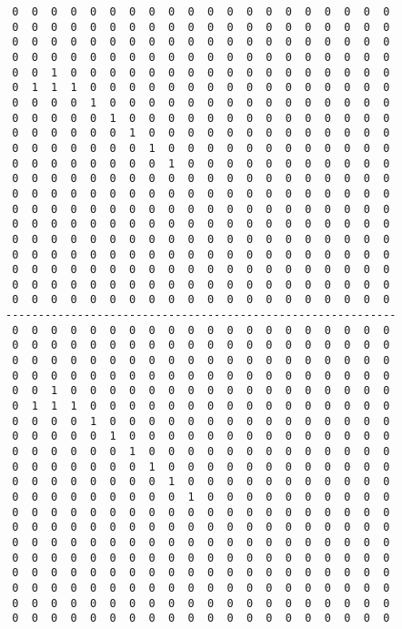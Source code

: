 \begin{verbatim}
 0  0  0  0  0  0  0  0  0  0  0  0  0  0  0  0  0  0  0  0
 0  0  0  0  0  0  0  0  0  0  0  0  0  0  0  0  0  0  0  0
 0  0  0  0  0  0  0  0  0  0  0  0  0  0  0  0  0  0  0  0
 0  0  0  0  0  0  0  0  0  0  0  0  0  0  0  0  0  0  0  0
 0  0  1  0  0  0  0  0  0  0  0  0  0  0  0  0  0  0  0  0
 0  1  1  1  0  0  0  0  0  0  0  0  0  0  0  0  0  0  0  0
 0  0  0  0  1  0  0  0  0  0  0  0  0  0  0  0  0  0  0  0
 0  0  0  0  0  1  0  0  0  0  0  0  0  0  0  0  0  0  0  0
 0  0  0  0  0  0  1  0  0  0  0  0  0  0  0  0  0  0  0  0
 0  0  0  0  0  0  0  1  0  0  0  0  0  0  0  0  0  0  0  0
 0  0  0  0  0  0  0  0  1  0  0  0  0  0  0  0  0  0  0  0
 0  0  0  0  0  0  0  0  0  0  0  0  0  0  0  0  0  0  0  0
 0  0  0  0  0  0  0  0  0  0  0  0  0  0  0  0  0  0  0  0
 0  0  0  0  0  0  0  0  0  0  0  0  0  0  0  0  0  0  0  0
 0  0  0  0  0  0  0  0  0  0  0  0  0  0  0  0  0  0  0  0
 0  0  0  0  0  0  0  0  0  0  0  0  0  0  0  0  0  0  0  0
 0  0  0  0  0  0  0  0  0  0  0  0  0  0  0  0  0  0  0  0
 0  0  0  0  0  0  0  0  0  0  0  0  0  0  0  0  0  0  0  0
 0  0  0  0  0  0  0  0  0  0  0  0  0  0  0  0  0  0  0  0
 0  0  0  0  0  0  0  0  0  0  0  0  0  0  0  0  0  0  0  0
------------------------------------------------------------
 0  0  0  0  0  0  0  0  0  0  0  0  0  0  0  0  0  0  0  0
 0  0  0  0  0  0  0  0  0  0  0  0  0  0  0  0  0  0  0  0
 0  0  0  0  0  0  0  0  0  0  0  0  0  0  0  0  0  0  0  0
 0  0  0  0  0  0  0  0  0  0  0  0  0  0  0  0  0  0  0  0
 0  0  1  0  0  0  0  0  0  0  0  0  0  0  0  0  0  0  0  0
 0  1  1  1  0  0  0  0  0  0  0  0  0  0  0  0  0  0  0  0
 0  0  0  0  1  0  0  0  0  0  0  0  0  0  0  0  0  0  0  0
 0  0  0  0  0  1  0  0  0  0  0  0  0  0  0  0  0  0  0  0
 0  0  0  0  0  0  1  0  0  0  0  0  0  0  0  0  0  0  0  0
 0  0  0  0  0  0  0  1  0  0  0  0  0  0  0  0  0  0  0  0
 0  0  0  0  0  0  0  0  1  0  0  0  0  0  0  0  0  0  0  0
 0  0  0  0  0  0  0  0  0  1  0  0  0  0  0  0  0  0  0  0
 0  0  0  0  0  0  0  0  0  0  0  0  0  0  0  0  0  0  0  0
 0  0  0  0  0  0  0  0  0  0  0  0  0  0  0  0  0  0  0  0
 0  0  0  0  0  0  0  0  0  0  0  0  0  0  0  0  0  0  0  0
 0  0  0  0  0  0  0  0  0  0  0  0  0  0  0  0  0  0  0  0
 0  0  0  0  0  0  0  0  0  0  0  0  0  0  0  0  0  0  0  0
 0  0  0  0  0  0  0  0  0  0  0  0  0  0  0  0  0  0  0  0
 0  0  0  0  0  0  0  0  0  0  0  0  0  0  0  0  0  0  0  0
 0  0  0  0  0  0  0  0  0  0  0  0  0  0  0  0  0  0  0  0
\end{verbatim}
\pagebreak
